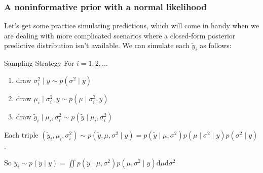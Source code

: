 \documentclass{beamer}
\begin{document}
\begin{frame}
\frametitle{A noninformative prior with a normal likelihood}

Let's get some practice simulating predictions, which will come in handy when we are dealing with more complicated scenarios where a closed-form posterior predictive distribution isn't available. We can simulate each $\tilde{y}_i$  as follows:

\begin{block}{Sampling Strategy}
For $i=1,2,\ldots$
\begin{enumerate}
\item draw $\sigma^2_i \mid y \sim p(\sigma^2 \mid y)$
\item draw $\mu_i \mid \sigma^2_i, y \sim p(\mu \mid \sigma^2_i, y)$
\item draw $\tilde{y}_i \mid \mu_i, \sigma^2_i \sim p(\tilde{y} \mid \mu_i, \sigma^2_i)$
\end{enumerate}
\end{block}

Each triple $(\tilde{y}_i, \mu_i, \sigma^2_i) \sim p(\tilde{y}, \mu, \sigma^2 \mid y) = p(\tilde{y} \mid \mu, \sigma^2) p(\mu \mid \sigma^2 \mid y)p(\sigma^2 \mid y)$.
\newline

So $ \tilde{y}_i \sim p(\tilde{y} \mid y) = \iint p(\tilde{y} \mid \mu, \sigma^2) p(\mu, \sigma^2 \mid y) \text{d} \mu \text{d} \sigma^2$



\end{frame}





\end{document}
